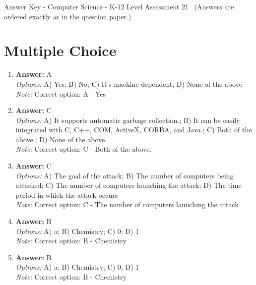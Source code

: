 \documentclass[12pt]{article}
\begin{document}
\begin{center}
Answer Key - Computer Science - K-12 Level Assessment 21 \
\small (Answers are ordered exactly as in the question paper.)
\end{center}

\section*{Multiple Choice}
\begin{enumerate}[label=\arabic*.]
\item \textbf{Answer:} A
\\ \textit{Options:} A) Yes; B) No; C) It's machine-dependent; D) None of the above
\\ \textit{Note:} Correct option: A - Yes
\item \textbf{Answer:} C
\\ \textit{Options:} A) It supports automatic garbage collection.; B) It can be easily integrated with C, C++, COM, ActiveX, CORBA, and Java.; C) Both of the above.; D) None of the above.
\\ \textit{Note:} Correct option: C - Both of the above.
\item \textbf{Answer:} C
\\ \textit{Options:} A) The goal of the attack; B) The number of computers being attacked; C) The number of computers launching the attack; D) The time period in which the attack occurs
\\ \textit{Note:} Correct option: C - The number of computers launching the attack
\item \textbf{Answer:} B
\\ \textit{Options:} A) a; B) Chemistry; C) 0; D) 1
\\ \textit{Note:} Correct option: B - Chemistry
\item \textbf{Answer:} B
\\ \textit{Options:} A) a; B) Chemistry; C) 0; D) 1
\\ \textit{Note:} Correct option: B - Chemistry
\end{enumerate}
\end{document}
